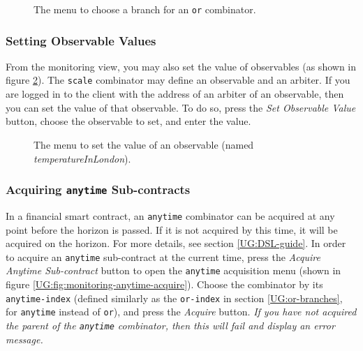 \begin{figure}[h]
    \centering
    \caption{The menu to choose a branch for an \texttt{or} combinator.}
    \label{UG:fig:monitoring-or-select}
\end{figure}


\subsubsection{Setting Observable Values}

From the monitoring view, you may also set the value of observables (as shown in figure \ref{UG:fig:monitoring-obs-select}). The \texttt{scale} combinator may define an observable and an arbiter. If you are logged in to the client with the address of an arbiter of an observable, then you can set the value of that observable. To do so, press the \textit{Set Observable Value} button, choose the observable to set, and enter the value.

\begin{figure}[h]
    \centering
    \caption{The menu to set the value of an observable (named \textit{temperatureInLondon}).}
    \label{UG:fig:monitoring-obs-select}
\end{figure}


\subsubsection{Acquiring \texttt{anytime} Sub-contracts}

In a financial smart contract, an \texttt{anytime} combinator can be acquired at any point before the horizon is passed. If it is not acquired by this time, it will be acquired on the horizon. For more details, see section \ref{UG:DSL-guide}. In order to acquire an \texttt{anytime} sub-contract at the current time, press the \textit{Acquire Anytime Sub-contract} button to open the \texttt{anytime} acquisition menu (shown in figure \ref{UG:fig:monitoring-anytime-acquire}). Choose the combinator by its \texttt{anytime-index} (defined similarly as the \texttt{or-index} in section \ref{UG:or-branches}, for \texttt{anytime} instead of \texttt{or}), and press the \textit{Acquire} button. \textit{If you have not acquired the parent of the \texttt{anytime} combinator, then this will fail and display an error message.}


